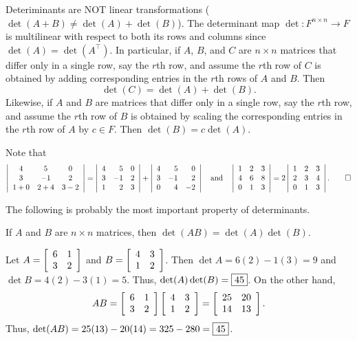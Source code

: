 Deteriminants are NOT linear transformations ($\det(A+B) \neq \det(A) +\det(B)$). The determinant map $\det  : F^{n\times n} \to F$ is multilinear with respect to both its rows and columns since $\det(A) = \det(A^\top )$. In particular, if $A$, $B$, and $C$ are $n\times n$ matrices that differ only in a single row, say the $r$th row, and assume the $r$th row of $C$ is obtained by adding corresponding entries in the $r$th rows of $A$ and $B$. Then 
\[\det(C) = \det(A) + \det(B).\] Likewise, if $A$ and $B$ are matrices that differ only in a single row, say the $r$th row, and assume the $r$th row of $B$ is obtained by scaling the  corresponding entries in the $r$th row of $A$ by $c\in F$. Then $\det(B) = c\det(A)$.\\

\begin{Exam} Note that 
\[\dtx{ccc}{  4&5&0\\3&-1&2\\ 1+0&2+4&3-2} = \dtx{rrr}{ 4&5&0\\3&-1&2\\ 1&2&3} + \dtx{rrr}{  4&5&0\\3&-1&2\\ 0&4&-2}\quad\text{and}\quad \dtx{ccc}{1&2&3\\4&6&8\\0&1&3} =  2\dtx{ccc}{1&2&3\\2&3&4\\0&1&3}. \qedhere\] %
\end{Exam}\vs

The following is probably the most important property of determinants.\\

\begin{Thm}\label{thm:deterproduct} If $A$ and $B$ are $n \times n$ matrices, then $\det(AB) = \det(A)\det(B)$.\end{Thm}\vs

\begin{Exam} Let $A = \mtx{rr}{6&1\\3&2}$ and $B =\mtx{rr}{4&3\\1&2}$. Then $\det A = 6(2)-1(3) = 9$ and $\det B = 4(2)-3(1)=5$. Thus, $\det(A)\det(B) = \fbox{$45$}$. On the other hand, 
\[AB = \mtx{rr}{6&1\\3&2}\mtx{rr}{4&3\\1&2} = \mtx{rr}{25 & 20\\ 14&13}.\] Thus, $\det(AB) = 25(13)-20(14) = 325-280= \fbox{$45$}$. 
\end{Exam}\vs

